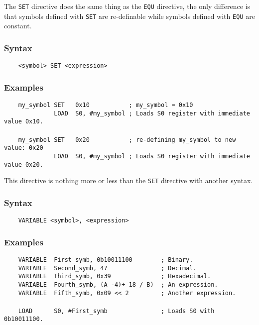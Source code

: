     \clearpage
        The \texttt{SET} directive does the same thing as the \texttt{EQU} directive, the only difference is that symbols defined with \texttt{SET} are re-definable while symbols defined with \texttt{EQU} are constant.

        \subsubsection{Syntax}
            \verb'    <symbol> SET <expression>'

        \subsubsection{Examples}
            \verb'    my_symbol SET   0x10           ; my_symbol = 0x10'\\
            \verb'              LOAD  S0, #my_symbol ; Loads S0 register with immediate value 0x10.'\\
            \verb''\\
            \verb'    my_symbol SET   0x20           ; re-defining my_symbol to new value: 0x20'\\
            \verb'              LOAD  S0, #my_symbol ; Loads S0 register with immediate value 0x20.'

        This directive is nothing more or less than the \texttt{SET} directive with another syntax.

        \subsubsection{Syntax}
            \verb'    VARIABLE <symbol>, <expression>'

        \subsubsection{Examples}
            \verb'    VARIABLE  First_symb, 0b10011100        ; Binary.'\\
            \verb'    VARIABLE  Second_symb, 47               ; Decimal.'\\
            \verb'    VARIABLE  Third_symb, 0x39              ; Hexadecimal.'\\
            \verb'    VARIABLE  Fourth_symb, (A -4)+ 18 / B)  ; An expression.'\\
            \verb'    VARIABLE  Fifth_symb, 0x09 << 2         ; Another expression.'\\
            \verb''\\
            \verb'    LOAD      S0, #First_symb               ; Loads S0 with 0b10011100.'

